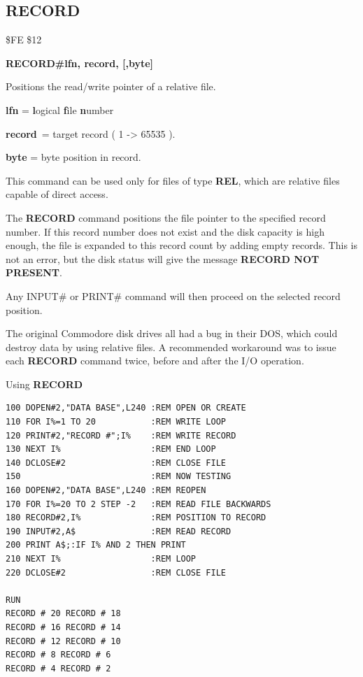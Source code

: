 
\newpage
\subsection{RECORD}
\begin{description}[leftmargin=2cm,style=nextline]
\item [Token:] \$FE \$12
\item [Format:] {\bf RECORD\#lfn, record, [,byte]}
\item [Usage:]  Positions the read/write pointer of a relative file.

                {\bf lfn} = {\bf l}ogical {\bf f}ile {\bf n}umber

                {\bf record} = target record ( 1 -> 65535 ).

                {\bf byte} = byte position in record.

                This command can be used only for files of
                type {\bf REL}, which are relative files capable
                of direct access.

               The {\bf RECORD} command positions the file pointer
               to the specified record number. If this record number
               does not exist and the disk capacity is high enough,
               the file is expanded to this record count by adding
               empty records. This is not an error, but the disk
               status will give the message {\bf RECORD NOT PRESENT}.

               Any INPUT\# or PRINT\# command will then proceed
               on the selected record position.

\item [Remarks:] The original Commodore disk drives all had a bug
               in their DOS, which could destroy data by using
               relative files. A recommended workaround was to
               issue each {\bf RECORD} command twice, before
               and after the I/O operation.

\item [Example:] Using {\bf RECORD}
\begin{tcolorbox}[colback=black,coltext=white]
\verbatimfont{\codefont}
\begin{verbatim}
100 DOPEN#2,"DATA BASE",L240 :REM OPEN OR CREATE
110 FOR I%=1 TO 20           :REM WRITE LOOP
120 PRINT#2,"RECORD #";I%    :REM WRITE RECORD
130 NEXT I%                  :REM END LOOP
140 DCLOSE#2                 :REM CLOSE FILE
150                          :REM NOW TESTING
160 DOPEN#2,"DATA BASE",L240 :REM REOPEN
170 FOR I%=20 TO 2 STEP -2   :REM READ FILE BACKWARDS
180 RECORD#2,I%              :REM POSITION TO RECORD
190 INPUT#2,A$               :REM READ RECORD
200 PRINT A$;:IF I% AND 2 THEN PRINT
210 NEXT I%                  :REM LOOP
220 DCLOSE#2                 :REM CLOSE FILE

RUN
RECORD # 20 RECORD # 18
RECORD # 16 RECORD # 14
RECORD # 12 RECORD # 10
RECORD # 8 RECORD # 6
RECORD # 4 RECORD # 2
\end{verbatim}
\end{tcolorbox}
\end{description}

